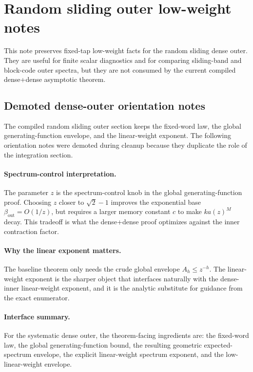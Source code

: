 \section{Random sliding outer low-weight notes}
\label{sec:random-sliding-outer-low-weight-notes}

This note preserves fixed-tap low-weight facts for the random sliding dense outer. They are useful for finite scalar
diagnostics and for comparing sliding-band and block-code outer spectra, but they are not consumed by the current
compiled dense+dense asymptotic theorem.

\subsection{Demoted dense-outer orientation notes}

The compiled random sliding outer section keeps the fixed-word law, the global generating-function envelope, and the
linear-weight exponent.  The following orientation notes were demoted during cleanup because they duplicate the role of
the integration section.

\paragraph{Spectrum-control interpretation.}
The parameter \(z\) is the spectrum-control knob in the global generating-function proof.
Choosing \(z\) closer to \(\sqrt2-1\) improves the exponential base \(\beta_{\mathrm{out}}=O(1/z)\), but requires a
larger memory constant \(c\) to make \(ka(z)^M\) decay.
This tradeoff is what the dense+dense proof optimizes against the inner contraction factor.

\paragraph{Why the linear exponent matters.}
The baseline theorem only needs the crude global envelope \(A_h\le z^{-h}\).
The linear-weight exponent is the sharper object that interfaces naturally with the dense-inner linear-weight exponent,
and it is the analytic substitute for guidance from the exact enumerator.

\paragraph{Interface summary.}
For the systematic dense outer, the theorem-facing ingredients are: the fixed-word law, the global generating-function
bound, the resulting geometric expected-spectrum envelope, the explicit linear-weight spectrum exponent, and the
low-linear-weight envelope.

